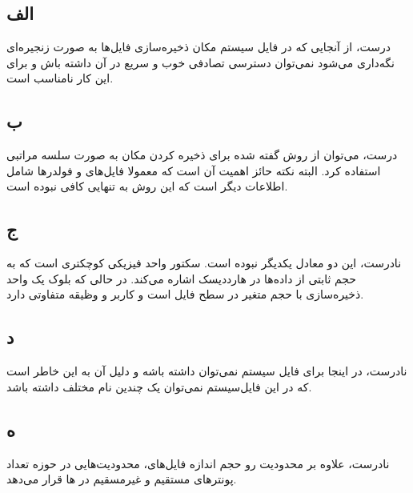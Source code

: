 \subsection*{الف}
درست، از آنجایی که در فایل سیستم
مکان ذخیره‌سازی فایل‌ها به صورت زنجیره‌ای نگه‌داری می‌شود نمی‌توان دسترسی تصادفی خوب و سریع در آن داشته باش و برای این‌ کار نامناسب است.

\subsection*{ب}
درست، می‌توان از روش گفته شده برای ذخیره کردن مکان به صورت سلسه ‌مراتبی استفاده کرد. البته نکته حائز اهمیت آن است که معمولا فایل‌های و فولدرها شامل اطلاعات دیگر است که این روش به تنهایی کافی نبوده است.

\subsection*{ج}
نادرست، این دو معادل یکدیگر نبوده است. سکتور واحد فیزیکی کوچکتری است که به حجم ثابتی از داده‌ها در هارددیسک اشاره می‌کند. در حالی که بلوک یک واحد ذخیره‌سازی با حجم متغیر در سطح فایل است و کاربر و وظیقه متفاوتی دارد.

\subsection*{د}
نادرست، در اینجا برای فایل سیستم
نمی‌توان
داشته باشه و دلیل آن به این خاطر است که در این فایل‌سیستم نمی‌توان یک
چندین نام مختلف داشته باشد.

\subsection*{ه}
نادرست، علاوه بر محدودیت رو حجم اندازه فایل‌های،
محدودیت‌هایی در حوزه تعداد پونترهای مستقیم و غیرمسقیم در
ها قرار می‌دهد.